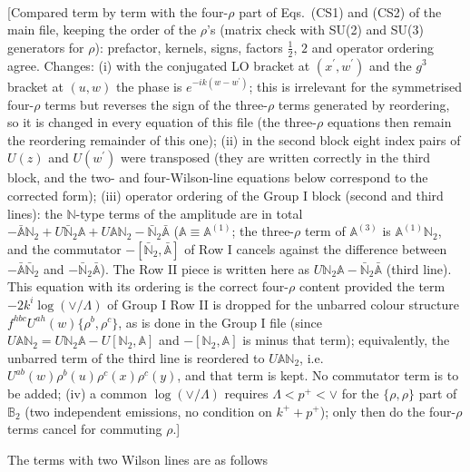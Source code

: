 \documentclass[aps,prd,amsmath,amssymb,nofootinbib]{revtex4-2}
\def\mf#1{\mathbb{#1}}
\numberwithin{equation}{section}
\begin{document}
\begin{align}
\end{align} {\color{red}[Compared term by term with the four-$\rho$ part of Eqs.~(CS1) and (CS2) of the main file, keeping the order of the $\rho$'s (matrix check with SU(2) and SU(3) generators for $\rho$): prefactor, kernels, signs, factors $\frac12$, $2$ and operator ordering agree. Changes: (i) with the conjugated LO bracket at $(x^{\prime},w^{\prime})$ and the $g^{3}$ bracket at $(u,w)$ the phase is $e^{-ik(w-w^{\prime})}$; this is irrelevant for the symmetrised four-$\rho$ terms but reverses the sign of the three-$\rho$ terms generated by reordering, so it is changed in every equation of this file (the three-$\rho$ equations then remain the reordering remainder of this one); (ii) in the second block eight index pairs of $U(z)$ and $U(w^{\prime})$ were transposed (they are written correctly in the third block, and the two- and four-Wilson-line equations below correspond to the corrected form); (iii) operator ordering of the Group I block (second and third lines): the $\mf{N}$-type terms of the amplitude are in total $-\bar{\mf{A}}\mf{N}_{2}+U\bar{\mf{N}}_{2}\mf{A}+U\mf{A}\mf{N}_{2}-\bar{\mf{N}}_{2}\bar{\mf{A}}$ ($\mf{A}\equiv\mf{A}^{(1)}$; the three-$\rho$ term of $\mf{A}^{(3)}$ is $\mf{A}^{(1)}\mf{N}_{2}$, and the commutator $-[\bar{\mf{N}}_{2},\bar{\mf{A}}]$ of Row I cancels against the difference between $-\bar{\mf{A}}\bar{\mf{N}}_{2}$ and $-\bar{\mf{N}}_{2}\bar{\mf{A}}$). The Row II piece is written here as $U\mf{N}_{2}\mf{A}-\bar{\mf{N}}_{2}\bar{\mf{A}}$ (third line). This equation with its ordering is the correct four-$\rho$ content provided the term $-2k^{i}\log(\vee/\Lambda)$ of Group I Row II is dropped for the unbarred colour structure $f^{hbc}U^{ah}(w)\{\rho^{b},\rho^{c}\}$, as is done in the Group I file (since $U\mf{A}\mf{N}_{2}=U\mf{N}_{2}\mf{A}-U[\mf{N}_{2},\mf{A}]$ and $-[\mf{N}_{2},\mf{A}]$ is minus that term); equivalently, the unbarred term of the third line is reordered to $U\mf{A}\mf{N}_{2}$, i.e. $U^{ab}(w)\rho^{b}(u)\rho^{c}(x)\rho^{c}(y)$, and that term is kept. No commutator term is to be added; (iv) a common $\log(\vee/\Lambda)$ requires $\Lambda<p^{+}<\vee$ for the $\{\rho,\rho\}$ part of $\mf{B}_{2}$ (two independent emissions, no condition on $k^{+}+p^{+}$); only then do the four-$\rho$ terms cancel for commuting $\rho$.]}\par\noindent 
The terms with two Wilson lines are as follows
\end{document}

